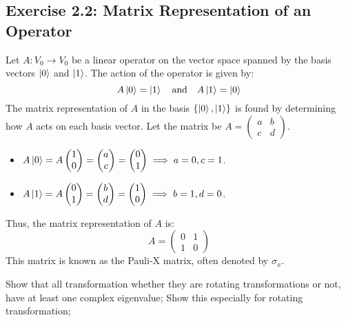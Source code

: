 \documentclass{article}
\begin{document}
\subsection*{Exercise 2.2: Matrix Representation of an Operator}
Let $A: V_0 \to V_0$ be a linear operator on the vector space spanned by the basis vectors $\ket{0}$ and $\ket{1}$. The action of the operator is given by:
$$ A\ket{0} = \ket{1} \quad \text{and} \quad A\ket{1} = \ket{0} $$
The matrix representation of $A$ in the basis $\{\ket{0}, \ket{1}\}$ is found by determining how $A$ acts on each basis vector. Let the matrix be $A = \begin{pmatrix} a & b \\ c & d \end{pmatrix}$.
\begin{itemize}
    \item $A\ket{0} = A \begin{pmatrix} 1 \\ 0 \end{pmatrix} = \begin{pmatrix} a \\ c \end{pmatrix} = \begin{pmatrix} 0 \\ 1 \end{pmatrix} \implies a=0, c=1$.
    \item $A\ket{1} = A \begin{pmatrix} 0 \\ 1 \end{pmatrix} = \begin{pmatrix} b \\ d \end{pmatrix} = \begin{pmatrix} 1 \\ 0 \end{pmatrix} \implies b=1, d=0$.
\end{itemize} 
Thus, the matrix representation of $A$ is:
$$ A = \begin{pmatrix} 0 & 1 \\ 1 & 0 \end{pmatrix} $$
This matrix is known as the Pauli-X matrix, often denoted by $\sigma_x$.

Show that all transformation whether they are rotating transformations or not, have at least one complex eigenvalue; Show this especially for  rotating transformation;
\end{document}
